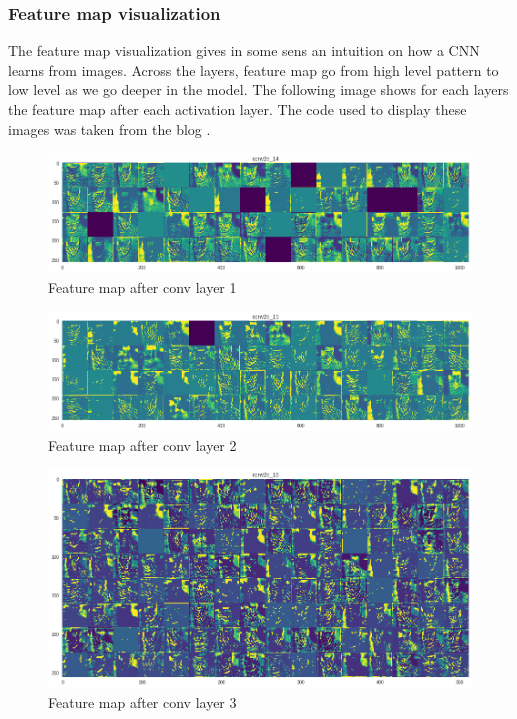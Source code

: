 \documentclass[a4paper]{article}
\begin{document}
\subsubsection{Feature map visualization}
The feature map visualization gives in some sens an intuition on how a CNN learns from images. Across the layers, feature map go from high level pattern to low level as we go deeper in the model. The following image shows for each layers the feature map after each activation layer. The code used to display these images was taken from the blog \cite{featuremap}.

\begin{figure}[h!]
	\centering
	\includegraphics[scale=.3]{fp1.png}
	\caption{Feature map after conv layer 1}
	\label{fig:fp1}
\end{figure}

\begin{figure}[h!]
	\centering
	\includegraphics[scale=.3]{fp2.png}
	\caption{Feature map after conv layer 2}
	\label{fig:fp2}
\end{figure}

\begin{figure}[h!]
	\centering
	\includegraphics[scale=.3]{fp3.png}
	\caption{Feature map after conv layer 3}
	\label{fig:fp3}
\end{figure}
\end{document}

